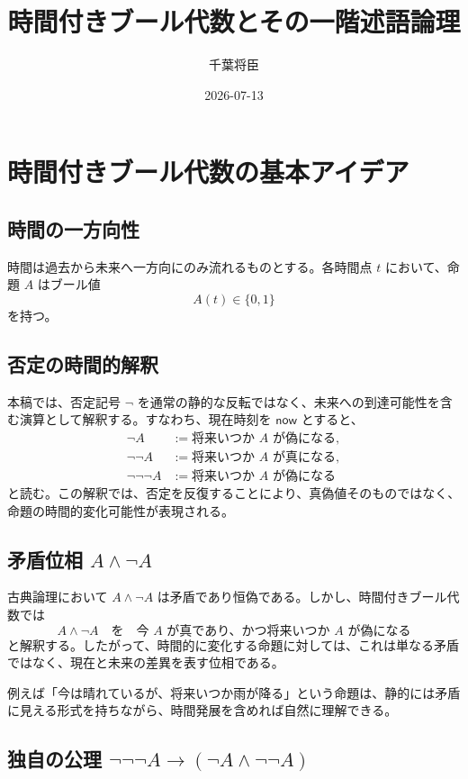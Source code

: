 \documentclass[10pt]{ltjsarticle}
\title{時間付きブール代数とその一階述語論理}
\author{千葉将臣}
\date{2026-07-13}
\begin{document}
\maketitle

\section{時間付きブール代数の基本アイデア}

\subsection{時間の一方向性}

時間は過去から未来へ一方向にのみ流れるものとする。各時間点 $t$ において、命題 $A$ はブール値
\[
  A(t) \in \{0,1\}
\]
を持つ。

\subsection{否定の時間的解釈}

本稿では、否定記号 $\neg$ を通常の静的な反転ではなく、未来への到達可能性を含む演算として解釈する。すなわち、現在時刻を $\mathsf{now}$ とすると、
\begin{align*}
  \neg A &:= \text{将来いつか $A$ が偽になる}, \\
  \neg\neg A &:= \text{将来いつか $A$ が真になる}, \\
  \neg\neg\neg A &:= \text{将来いつか $A$ が偽になる}
\end{align*}
と読む。この解釈では、否定を反復することにより、真偽値そのものではなく、命題の時間的変化可能性が表現される。

\subsection{\texorpdfstring{矛盾位相 $A \land \neg A$}{矛盾位相 A and not A}}

古典論理において $A \land \neg A$ は矛盾であり恒偽である。しかし、時間付きブール代数では
\[
  A \land \neg A
  \quad\text{を}\quad
  \text{今 $A$ が真であり、かつ将来いつか $A$ が偽になる}
\]
と解釈する。したがって、時間的に変化する命題に対しては、これは単なる矛盾ではなく、現在と未来の差異を表す位相である。

例えば「今は晴れているが、将来いつか雨が降る」という命題は、静的には矛盾に見える形式を持ちながら、時間発展を含めれば自然に理解できる。

\subsection{\texorpdfstring{独自の公理 $\neg\neg\neg A \to (\neg A \land \neg\neg A)$}{独自の公理 not not not A implies not A and not not A}}
\end{document}
